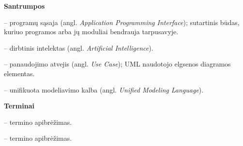 \textbf{Santrumpos}

\begin{description}[leftmargin=0pt,labelsep=0.5em,itemsep=2pt,parsep=0pt]
\item[API] -- programų sąsaja (angl. \textit{Application Programming Interface}); sutartinis būdas, kuriuo programos arba jų moduliai bendrauja tarpusavyje.
\item[DI] -- dirbtinis intelektas (angl. \textit{Artificial Intelligence}).
\item[PA] -- panaudojimo atvejis (angl. \textit{Use Case}); UML naudotojo elgsenos diagramos elementas.
\item[UML] -- unifikuota modeliavimo kalba (angl. \textit{Unified Modeling Language}).
\end{description}

\textbf{Terminai}

\begin{description}[leftmargin=0pt,labelsep=0.5em,itemsep=2pt,parsep=0pt]
\item[Terminas] -- termino apibrėžimas.
\item[Kitas terminas] -- termino apibrėžimas.
\end{description}
